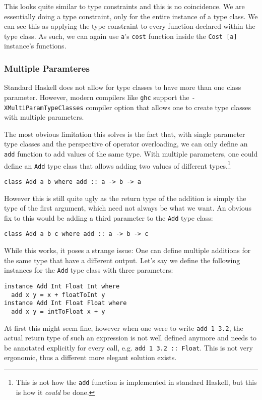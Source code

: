 This looks quite similar to type constraints and this is no coincidence. We are essentially doing a type constraint, only for the entire instance of a type class. We can see this as applying the type constraint to every function declared within the type class. As such, we can again use \verb|a|'s \verb|cost| function inside the \verb|Cost [a]| instance's functions.



\subsubsection{Multiple Paramteres}\label{haskell-add}

Standard Haskell does not allow for type classes to have more than one class parameter. However, modern compilers like \verb|ghc| support the \verb|-XMultiParamTypeClasses| compiler option that allows one to create type classes with multiple parameters.

The most obvious limitation this solves is the fact that, with single parameter type classes and the perspective of operator overloading, we can only define an \verb|add| function to add values of the same type. With multiple parameters, one could define an \verb|Add| type class that allows adding two values of different types.\footnote{This is not how the \verb|add| function is implemented in standard Haskell, but this is how it \textit{could} be done.}
\begin{verbatim}
class Add a b where add :: a -> b -> a
\end{verbatim}
However this is still quite ugly as the return type of the addition is simply the type of the first argument, which need not always be what we want. An obvious fix to this would be adding a third parameter to the \verb|Add| type class:
\begin{verbatim}
class Add a b c where add :: a -> b -> c
\end{verbatim}
While this works, it poses a strange issue: One can define multiple additions for the same type that have a different output. Let's say we define the following instances for the \verb|Add| type class with three parameters:
\begin{verbatim}
instance Add Int Float Int where
  add x y = x + floatToInt y
instance Add Int Float Float where
  add x y = intToFloat x + y
\end{verbatim}
At first this might seem fine, however when one were to write \verb|add 1 3.2|, the actual return type of such an expression is not well defined anymore and needs to be annotated explicitly for every call, e.g. \verb|add 1 3.2 :: Float|. This is not very ergonomic, thus a different more elegant solution exists.

